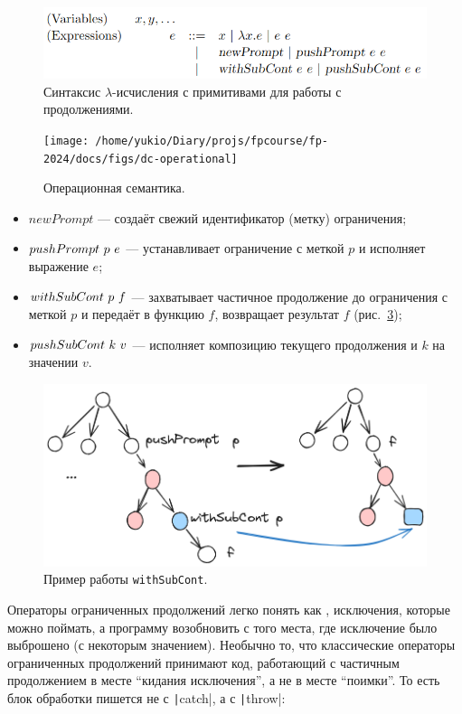\begin{figure}[h]
    \centering
    \includegraphics[width=0.75\linewidth]{figs/prompt-syntax}
    \caption{Синтаксис $\lambda$-исчисления с примитивами для работы с продолжениями.}
    \label{fig:prompt-syntax}
\end{figure}

\begin{figure}
    \centering
    \texttt{[image: /home/yukio/Diary/projs/fpcourse/fp-2024/docs/figs/dc-operational]}
    \caption{Операционная семантика.}
    \label{fig:dc-operational}
\end{figure}

\begin{itemize}
    \item $newPrompt$ --- создаёт свежий идентификатор (метку) ограничения;
    \item $pushPrompt ~ p ~ e$ --- устанавливает ограничение с меткой $p$ и исполняет выражение $e$;
    \item $withSubCont~ p~ f$ --- захватывает частичное продолжение до ограничения с меткой $p$ и передаёт в функцию $f$, возвращает результат $f$ (рис.~\ref{fig:push-prompt});
    \item $pushSubCont~ k ~ v$ --- исполняет композицию текущего продолжения и $k$ на значении $v$.
\end{itemize}

\begin{figure}[h]
    \centering
    \includegraphics[width=0.7\linewidth]{figs/push-prompt}
    \caption{Пример работы \texttt{withSubCont}.}
    \label{fig:push-prompt}
\end{figure}

Операторы ограниченных продолжений легко понять как , исключения, которые можно поймать, а программу возобновить с того места, где исключение было выброшено (с некоторым значением).
Необычно то, что классические операторы ограниченных продолжений принимают код, работающий с частичным продолжением в месте ``кидания исключения'', а не в месте ``поимки''.
То есть блок обработки пишется не с \texttt|catch|, а с \texttt|throw|:

